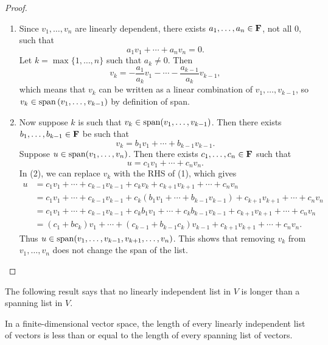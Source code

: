 \begin{proof} \
\begin{enumerate}[label=(\roman*)]
\item Since $v_1,\dots,v_n$ are linearly dependent, there exists $a_1,\dots,a_n\in\mathbf F$, not all $0$, such that
\[a_1v_1+\cdots+a_nv_n=0.\]
Let $k=\max\{1,\dots,n\}$ such that $a_k\neq0$. Then
\[v_k=-\frac{a_1}{a_k}v_1-\cdots-\frac{a_{k-1}}{a_k}v_{k-1},\]
which means that $v_k$ can be written as a linear combination of $v_1,\dots,v_{k-1}$, so $v_k\in\operatorname{span}\left(v_1,\dots,v_{k-1}\right)$ by definition of span.

\item Now suppose $k$ is such that $v_k\in\operatorname{span}(v_1,\dots,v_{k-1})$. Then there exists $b_1,\dots,b_{k-1}\in\mathbf F$ be such that
\begin{equation*}\tag{1}
v_k=b_1v_1+\cdots+b_{k-1}v_{k-1}.
\end{equation*}
Suppose $u\in\operatorname{span}(v_1,\dots,v_n)$. Then there exists $c_1,\dots,c_n\in\mathbf F$ such that
\begin{equation*}\tag{2}
u=c_1v_1+\cdots+c_nv_n.
\end{equation*}
In (2), we can replace $v_k$ with the RHS of (1), which gives
\begin{align*}
u&=c_1v_1+\cdots+c_{k-1}v_{k-1}+c_kv_k+c_{k+1}v_{k+1}+\cdots+c_nv_n\\
&=c_1v_1+\cdots+c_{k-1}v_{k-1}+c_k(b_1v_1+\cdots+b_{k-1}v_{k-1})+c_{k+1}v_{k+1}+\cdots+c_nv_n\\
&=c_1v_1+\cdots+c_{k-1}v_{k-1}+c_kb_1v_1+\cdots+c_kb_{k-1}v_{k-1}+c_{k+1}v_{k+1}+\cdots+c_nv_n\\
&=(c_1+bc_k)v_1+\cdots+(c_{k-1}+b_{k-1}c_k)v_{k-1}+c_{k+1}v_{k+1}+\cdots+c_nv_n.
\end{align*}
Thus $u\in\operatorname{span}(v_1,\dots,v_{k-1},v_{k+1},\dots,v_n)$. This shows that removing $v_k$ from $v_1,\dots,v_n$ does not change the span of the list.
\end{enumerate}
\end{proof}

The following result says that no linearly independent list in $V$ is longer than a spanning list in $V$.

\begin{proposition}\label{prop:length-linind-span}
In a finite-dimensional vector space, the length of every linearly independent list of vectors is less than or equal to the length of every spanning list of vectors.
\end{proposition}

